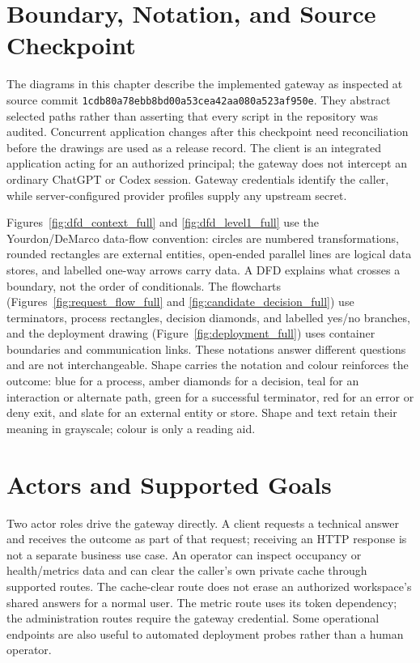 \section{Boundary, Notation, and Source Checkpoint}
The diagrams in this chapter describe the implemented gateway as inspected at source commit \texttt{1cdb80a78ebb8bd00a53cea42aa080a523af950e}. They abstract selected paths rather than asserting that every script in the repository was audited. Concurrent application changes after this checkpoint need reconciliation before the drawings are used as a release record. The client is an integrated application acting for an authorized principal; the gateway does not intercept an ordinary ChatGPT or Codex session. Gateway credentials identify the caller, while server-configured provider profiles supply any upstream secret.

Figures~\ref{fig:dfd_context_full} and \ref{fig:dfd_level1_full} use the Yourdon/DeMarco data-flow convention: circles are numbered transformations, rounded rectangles are external entities, open-ended parallel lines are logical data stores, and labelled one-way arrows carry data. A DFD explains what crosses a boundary, not the order of conditionals. The flowcharts (Figures~\ref{fig:request_flow_full} and \ref{fig:candidate_decision_full}) use terminators, process rectangles, decision diamonds, and labelled yes/no branches, and the deployment drawing (Figure~\ref{fig:deployment_full}) uses container boundaries and communication links. These notations answer different questions and are not interchangeable. Shape carries the notation and colour reinforces the outcome: blue for a process, amber diamonds for a decision, teal for an interaction or alternate path, green for a successful terminator, red for an error or deny exit, and slate for an external entity or store. Shape and text retain their meaning in grayscale; colour is only a reading aid.

\section{Actors and Supported Goals}
Two actor roles drive the gateway directly. A client requests a technical answer and receives the outcome as part of that request; receiving an HTTP response is not a separate business use case. An operator can inspect occupancy or health/metrics data and can clear the caller's own private cache through supported routes. The cache-clear route does not erase an authorized workspace's shared answers for a normal user. The metric route uses its token dependency; the administration routes require the gateway credential. Some operational endpoints are also useful to automated deployment probes rather than a human operator.

